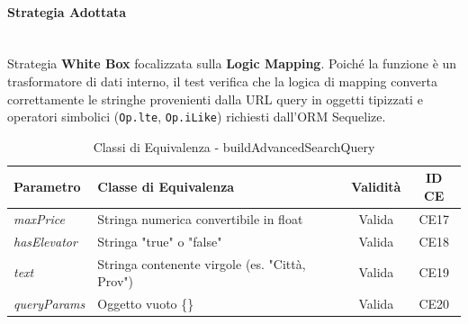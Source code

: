 \documentclass{article}
\begin{document}
\paragraph{Strategia Adottata} \mbox{} \\
Strategia \textbf{White Box} focalizzata sulla \textbf{Logic Mapping}. Poiché la funzione è un trasformatore di dati interno, il test verifica che la logica di mapping converta correttamente le stringhe provenienti dalla URL query in oggetti tipizzati e operatori simbolici (\texttt{Op.lte}, \texttt{Op.iLike}) richiesti dall'ORM Sequelize.

\newpage

\begin{table}[H]
    \centering
    \caption{Classi di Equivalenza - buildAdvancedSearchQuery}
    \begin{tabularx}{\textwidth}{|l|X|c|c|}
        \hline
        \rowcolor{DarkBlue}
        \textbf{\color{white}Parametro} & \textbf{\color{white}Classe di Equivalenza}    & \textbf{\color{white}Validità} & \textbf{\color{white}ID CE} \\ \hline
        \rowcolor[gray]{0.95}
        \textit{maxPrice}               & Stringa numerica convertibile in float         & Valida                         & CE17                        \\ \hline
        \textit{hasElevator}            & Stringa "true" o "false"                       & Valida                         & CE18                        \\ \hline
        \rowcolor[gray]{0.95}
        \textit{text}                   & Stringa contenente virgole (es. "Città, Prov") & Valida                         & CE19                        \\ \hline
        \textit{queryParams}            & Oggetto vuoto \{\}                             & Valida                         & CE20                        \\ \hline
    \end{tabularx}
\end{table}
\end{document}

